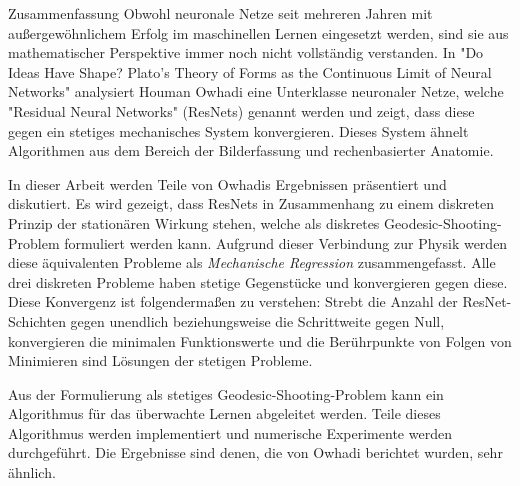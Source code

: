 \pagebreak
\begin{polyabstract}{Zusammenfassung}
	Obwohl neuronale Netze seit mehreren Jahren mit außergewöhnlichem Erfolg im maschinellen Lernen eingesetzt werden, sind sie aus mathematischer Perspektive immer noch nicht vollständig verstanden.
	In "Do Ideas Have Shape? Plato's Theory of Forms as the Continuous Limit of Neural Networks" analysiert Houman Owhadi eine Unterklasse neuronaler Netze, welche "Residual Neural Networks" (ResNets) genannt werden und zeigt, dass diese gegen ein stetiges mechanisches System konvergieren.
	Dieses System ähnelt Algorithmen aus dem Bereich der Bilderfassung und rechenbasierter Anatomie.
	
	In dieser Arbeit werden Teile von Owhadis Ergebnissen präsentiert und diskutiert.
	Es wird gezeigt, dass ResNets in Zusammenhang zu einem diskreten Prinzip der stationären Wirkung stehen, welche als diskretes Geodesic-Shooting-Problem formuliert werden kann.
	Aufgrund dieser Verbindung zur Physik werden diese äquivalenten Probleme als \emph{Mechanische Regression} zusammengefasst.
	Alle drei diskreten Probleme haben stetige Gegenstücke und konvergieren gegen diese.
	Diese Konvergenz ist folgendermaßen zu verstehen:
	Strebt die Anzahl der ResNet-Schichten gegen unendlich beziehungsweise die Schrittweite gegen Null, konvergieren die minimalen Funktionswerte und die Berührpunkte von Folgen von Minimieren sind Lösungen der stetigen Probleme.
	
	Aus der Formulierung als stetiges Geodesic-Shooting-Problem kann ein Algorithmus für das überwachte Lernen abgeleitet werden.
	Teile dieses Algorithmus werden implementiert und numerische Experimente werden durchgeführt.
	Die Ergebnisse sind denen, die von Owhadi berichtet wurden, sehr ähnlich.
\end{polyabstract}
